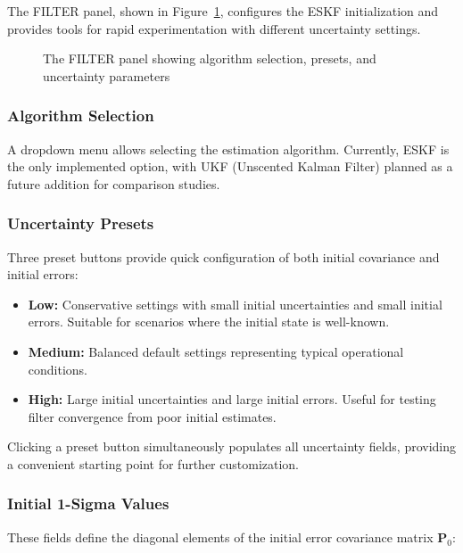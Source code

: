 \documentclass[11pt,a4paper]{article}
\begin{document}
The FILTER panel, shown in Figure~\ref{fig:filter_panel}, configures the ESKF initialization and provides tools for rapid experimentation with different uncertainty settings.

\begin{figure}[h]
    \centering
    \caption{The FILTER panel showing algorithm selection, presets, and uncertainty parameters}
    \label{fig:filter_panel}
\end{figure}

\subsubsection{Algorithm Selection}
A dropdown menu allows selecting the estimation algorithm. Currently, ESKF is the only implemented option, with UKF (Unscented Kalman Filter) planned as a future addition for comparison studies.

\subsubsection{Uncertainty Presets}
Three preset buttons provide quick configuration of both initial covariance and initial errors:

\begin{itemize}
    \item \textbf{Low:} Conservative settings with small initial uncertainties and small initial errors. Suitable for scenarios where the initial state is well-known.
    
    \item \textbf{Medium:} Balanced default settings representing typical operational conditions.
    
    \item \textbf{High:} Large initial uncertainties and large initial errors. Useful for testing filter convergence from poor initial estimates.
\end{itemize}

Clicking a preset button simultaneously populates all uncertainty fields, providing a convenient starting point for further customization.

\subsubsection{Initial 1-Sigma Values}
These fields define the diagonal elements of the initial error covariance matrix $\mathbf{P}_0$:
\end{document}
